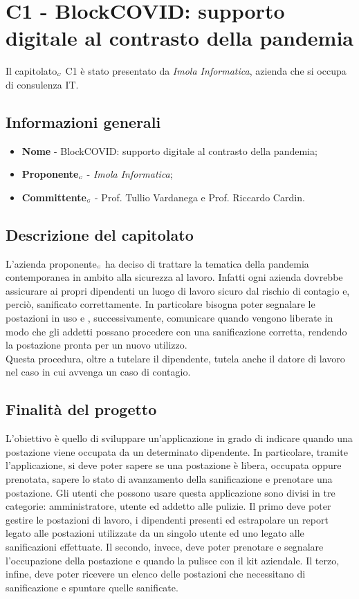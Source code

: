 \chapter{C1 - BlockCOVID: supporto digitale al contrasto della pandemia} \label{CapitolatoC1}

Il capitolato$_{\scaleto{G}{3pt}}$ C1 è stato presentato da \textit{Imola Informatica}, azienda che si occupa di consulenza IT.

\section{Informazioni generali} \label{C1InformazioniGenerali}
\begin{itemize}
	\item \textbf{Nome} - BlockCOVID: supporto digitale al contrasto della pandemia;
	\item \textbf{Proponente}$_{\scaleto{G}{3pt}}$ - \textit{Imola Informatica};
	\item \textbf{Committente}$_{\scaleto{G}{3pt}}$ - Prof. Tullio Vardanega e Prof. Riccardo Cardin.
\end{itemize}
\section{Descrizione del capitolato} \label{C1DescrizioneDelCapitolato}
L'azienda proponente$_{\scaleto{G}{3pt}}$ ha deciso di trattare la tematica della pandemia contemporanea in ambito alla sicurezza al lavoro. Infatti ogni azienda dovrebbe assicurare ai propri dipendenti un luogo di lavoro sicuro dal rischio di contagio e, perciò, sanificato correttamente. In particolare bisogna poter segnalare le postazioni in uso e , successivamente, comunicare quando vengono liberate in modo che gli addetti possano procedere con una sanificazione corretta, rendendo la postazione pronta per un nuovo utilizzo.\\
Questa procedura, oltre a tutelare il dipendente, tutela anche il datore di lavoro nel caso in cui avvenga un caso di contagio.
\section{Finalità del progetto} \label{C1FinalitàDelProgetto}
L'obiettivo è quello di sviluppare un'applicazione in grado di indicare quando una postazione viene occupata da un determinato dipendente. In particolare, tramite l'applicazione, si deve poter sapere se una postazione è libera, occupata oppure prenotata, sapere lo stato di avanzamento della sanificazione e prenotare una postazione. Gli utenti che possono usare questa applicazione sono divisi in tre categorie: amministratore, utente ed addetto alle pulizie. Il primo deve poter gestire le postazioni di lavoro, i dipendenti presenti ed estrapolare un report legato alle postazioni utilizzate da un singolo utente ed uno legato alle sanificazioni effettuate. Il secondo, invece, deve poter prenotare e segnalare l'occupazione della postazione e quando la pulisce con il kit aziendale. Il terzo, infine, deve poter ricevere un elenco delle postazioni che necessitano di sanificazione e spuntare quelle sanificate.

